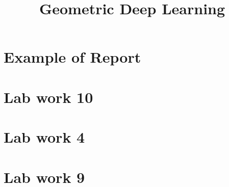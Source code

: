\documentclass[a4paper,14pt]{article}
\title{Geometric Deep Learning}
\date{}
\numberwithin{equation}{section}
\begin{document}
    \maketitle
    \tableofcontents

    \clearpage
    \section{Example of Report} %
    {} %

    \clearpage
    \section{Lab work 10} %
    {} %

    \clearpage
    \section{Lab work 4} %
    {} %

    \clearpage
    \section{Lab work 9} %
    {} %

    \clearpage
    \printbibliography
\end{document}
